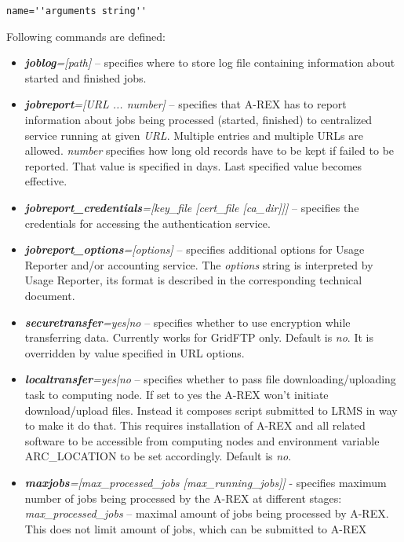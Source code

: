 \documentclass{article}                            %
\begin{document}
\begin{shaded}
\verb|name=''arguments string''|
\end{shaded}
Following commands are defined:

\begin{itemize}
\item \textbf{\textit{joblog}}\textit{={[}path]} -- specifies where to store
log file containing information about started and finished jobs.
\item \textbf{\textit{jobreport}}\textit{={[}URL ... number]} -- specifies
that A-REX has to report information about jobs being processed (started,
finished) to centralized service running at given \textit{URL}. Multiple
entries and multiple URLs are allowed. \textit{number} specifies how
long old records have to be kept if failed to be reported. That value
is specified in days. Last specified value becomes effective.
\item \textbf{\textit{jobreport\_credentials}}\textit{={[}key\_file
    {[}cert\_file {[}ca\_dir]]]} -- specifies the credentials for
  accessing the authentication service.
\item \textbf{\textit{jobreport\_options}}\textit{={[}options]}
  -- specifies additional options for Usage Reporter and/or
  accounting service. The \textit{options} string is interpreted by Usage
  Reporter, its format is described in the corresponding technical document.
\item \textbf{\textit{securetransfer}}\textit{=yes|no} -- specifies whether
to use encryption while transferring data. Currently works for GridFTP
only. Default is \emph{no}. It is overridden by value specified in
URL options.
\item \textbf{\textit{localtransfer}}\textit{=yes|no} -- specifies whether
to pass file downloading/uploading task to computing node. If set
to yes the A-REX won't initiate download/upload files. Instead it
composes script submitted to LRMS in way to make it do that. This
requires installation of A-REX and all related software to be accessible
from computing nodes and environment variable ARC\_LOCATION to be
set accordingly. Default is \emph{no}.
\item \textbf{\textit{maxjobs}}\textit{={[}max\_processed\_jobs {[}max\_running\_jobs]]}
- specifies maximum number of jobs being processed by the A-REX at
different stages:\\
\textit{max\_processed\_jobs} -- maximal amount of jobs being processed
by A-REX. This does not limit amount of jobs, which can be submitted
to A-REX\\

\end{itemize}
\end{document}
